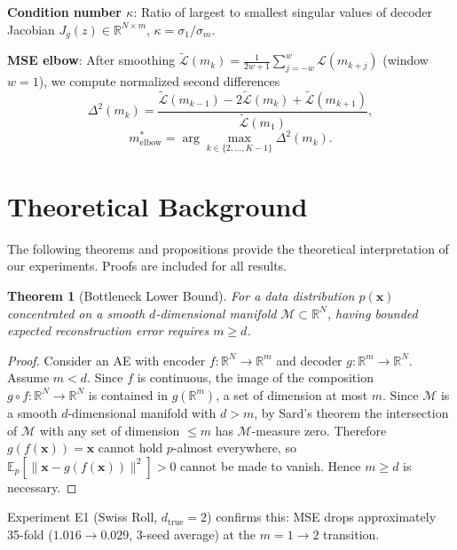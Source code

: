 \documentclass[lettersize,journal]{IEEEtran}
\newcommand{\dtrue}{d_{\mathrm{true}}}
\newcommand{\Jg}{J_g}
\newcommand{\R}{\mathbb{R}}
\newcommand{\kap}{\kappa}
\newtheorem{theorem}{Theorem}
\begin{document}
\textbf{Condition number $\kap$}: Ratio of largest to smallest singular values of decoder Jacobian $\Jg(z) \in \R^{N\times m}$,
$\kap = \sigma_1/\sigma_m$.

\textbf{MSE elbow}: After smoothing $\tilde{\mathcal{L}}(m_k) = \frac{1}{2w+1}\sum_{j=-w}^{w}\mathcal{L}(m_{k+j})$ (window $w=1$), we compute normalized second differences
\begin{equation}
  \Delta^2(m_k) = \frac{\tilde{\mathcal{L}}(m_{k-1}) - 2\tilde{\mathcal{L}}(m_k) + \tilde{\mathcal{L}}(m_{k+1})}{\tilde{\mathcal{L}}(m_1)},
  \label{eq:elbow}
\end{equation}
\begin{equation}
  m^*_\mathrm{elbow} = \arg\max_{k \in \{2,\ldots,K-1\}} \Delta^2(m_k).
  \label{eq:elbow_def}
\end{equation}

\section{Theoretical Background}\label{sec:theory}

The following theorems and propositions provide the theoretical interpretation of our experiments.
Proofs are included for all results.

\begin{theorem}[Bottleneck Lower Bound]\label{thm:lower_bound}
For a data distribution $p(\boldsymbol{x})$ concentrated on a smooth $d$-dimensional manifold $\mathcal{M} \subset \R^N$, having bounded expected reconstruction error requires $m \geq d$.
\end{theorem}

\begin{proof}
Consider an AE with encoder $f: \R^N \to \R^m$ and decoder $g: \R^m \to \R^N$.
Assume $m < d$.
Since $f$ is continuous, the image of the composition $g \circ f: \R^N \to \R^N$ is contained in $g(\R^m)$, a set of dimension at most $m$.
Since $\mathcal{M}$ is a smooth $d$-dimensional manifold with $d > m$, by Sard's theorem the intersection of $\mathcal{M}$ with any set of dimension $\leq m$ has $\mathcal{M}$-measure zero.
Therefore $g(f(\boldsymbol{x})) = \boldsymbol{x}$ cannot hold $p$-almost everywhere, so
$\mathbb{E}_{p}[\|\boldsymbol{x} - g(f(\boldsymbol{x}))\|^2] > 0$ cannot be made to vanish.
Hence $m \geq d$ is necessary.
\end{proof}

Experiment E1 (Swiss Roll, $\dtrue = 2$) confirms this: MSE drops approximately 35-fold ($1.016 \to 0.029$, 3-seed average) at the $m=1 \to 2$ transition.
\end{document}
